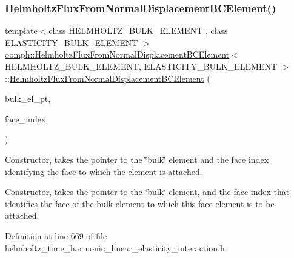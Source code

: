 \subsubsection{\texorpdfstring{Helmholtz\+Flux\+From\+Normal\+Displacement\+B\+C\+Element()}{HelmholtzFluxFromNormalDisplacementBCElement()}\hspace{0.1cm}{\footnotesize\ttfamily [1/2]}}
{\footnotesize\ttfamily template$<$class H\+E\+L\+M\+H\+O\+L\+T\+Z\+\_\+\+B\+U\+L\+K\+\_\+\+E\+L\+E\+M\+E\+NT , class E\+L\+A\+S\+T\+I\+C\+I\+T\+Y\+\_\+\+B\+U\+L\+K\+\_\+\+E\+L\+E\+M\+E\+NT $>$ \\
\hyperlink{classoomph_1_1HelmholtzFluxFromNormalDisplacementBCElement}{oomph\+::\+Helmholtz\+Flux\+From\+Normal\+Displacement\+B\+C\+Element}$<$ H\+E\+L\+M\+H\+O\+L\+T\+Z\+\_\+\+B\+U\+L\+K\+\_\+\+E\+L\+E\+M\+E\+NT, E\+L\+A\+S\+T\+I\+C\+I\+T\+Y\+\_\+\+B\+U\+L\+K\+\_\+\+E\+L\+E\+M\+E\+NT $>$\+::\hyperlink{classoomph_1_1HelmholtzFluxFromNormalDisplacementBCElement}{Helmholtz\+Flux\+From\+Normal\+Displacement\+B\+C\+Element} (\begin{DoxyParamCaption}\item[{\hyperlink{classoomph_1_1FiniteElement}{Finite\+Element} $\ast$const \&}]{bulk\+\_\+el\+\_\+pt,  }\item[{const int \&}]{face\+\_\+index }\end{DoxyParamCaption})}



Constructor, takes the pointer to the \char`\"{}bulk\char`\"{} element and the face index identifying the face to which the element is attached. 

Constructor, takes the pointer to the \char`\"{}bulk\char`\"{} element, and the face index that identifies the face of the bulk element to which this face element is to be attached. 

Definition at line 669 of file helmholtz\+\_\+time\+\_\+harmonic\+\_\+linear\+\_\+elasticity\+\_\+interaction.\+h.




